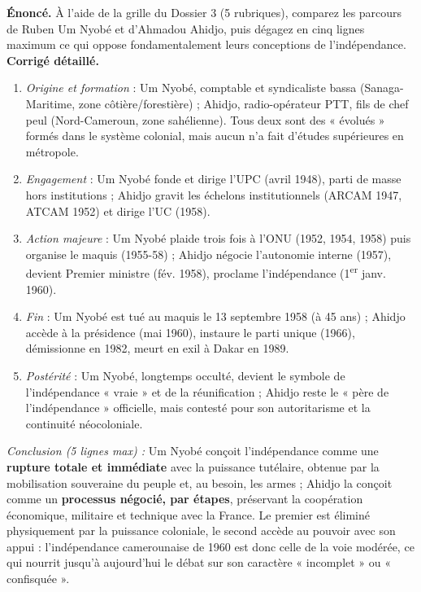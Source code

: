 \documentclass[11pt]{article}
\begin{document}
\begin{exoresolu}
\textbf{Énoncé.} À l'aide de la grille du Dossier 3 (5 rubriques), comparez les parcours de Ruben Um Nyobé et d'Ahmadou Ahidjo, puis dégagez en cinq lignes maximum ce qui oppose fondamentalement leurs conceptions de l'indépendance.
\tcblower
\textbf{Corrigé détaillé.}
\begin{enumerate}
\item \emph{Origine et formation} : Um Nyobé, comptable et syndicaliste bassa (Sanaga-Maritime, zone côtière/forestière) ; Ahidjo, radio-opérateur PTT, fils de chef peul (Nord-Cameroun, zone sahélienne). Tous deux sont des « évolués » formés dans le système colonial, mais aucun n'a fait d'études supérieures en métropole.
\item \emph{Engagement} : Um Nyobé fonde et dirige l'UPC (avril 1948), parti de masse hors institutions ; Ahidjo gravit les échelons institutionnels (ARCAM 1947, ATCAM 1952) et dirige l'UC (1958).
\item \emph{Action majeure} : Um Nyobé plaide trois fois à l'ONU (1952, 1954, 1958) puis organise le maquis (1955-58) ; Ahidjo négocie l'autonomie interne (1957), devient Premier ministre (fév. 1958), proclame l'indépendance (1\textsuperscript{er} janv. 1960).
\item \emph{Fin} : Um Nyobé est tué au maquis le 13 septembre 1958 (à 45 ans) ; Ahidjo accède à la présidence (mai 1960), instaure le parti unique (1966), démissionne en 1982, meurt en exil à Dakar en 1989.
\item \emph{Postérité} : Um Nyobé, longtemps occulté, devient le symbole de l'indépendance « vraie » et de la réunification ; Ahidjo reste le « père de l'indépendance » officielle, mais contesté pour son autoritarisme et la continuité néocoloniale.
\end{enumerate}
\emph{Conclusion (5 lignes max) :} Um Nyobé conçoit l'indépendance comme une \textbf{rupture totale et immédiate} avec la puissance tutélaire, obtenue par la mobilisation souveraine du peuple et, au besoin, les armes ; Ahidjo la conçoit comme un \textbf{processus négocié, par étapes}, préservant la coopération économique, militaire et technique avec la France. Le premier est éliminé physiquement par la puissance coloniale, le second accède au pouvoir avec son appui : l'indépendance camerounaise de 1960 est donc celle de la voie modérée, ce qui nourrit jusqu'à aujourd'hui le débat sur son caractère « incomplet » ou « confisquée ».
\end{exoresolu}
\end{document}
